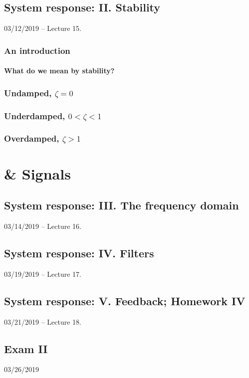 \documentclass[11pt]{book}
\begin{document}
\chapter{System response: II. Stability}
03/12/2019 – Lecture 15. 
\section{An introduction}
\subsection{What do we mean by stability?}
\section{Undamped, $\zeta = 0$}
\section{Underdamped, $0 < \zeta < 1$}
\section{Overdamped, $\zeta > 1$}



\part{\& Signals}



\chapter{System response: III. The frequency domain}
03/14/2019 – Lecture 16. 



\chapter{System response: IV. Filters}
03/19/2019 – Lecture 17. 



\chapter{System response: V. Feedback; Homework IV}
03/21/2019 – Lecture 18. 



\chapter*{Exam II}
03/26/2019
\end{document}
